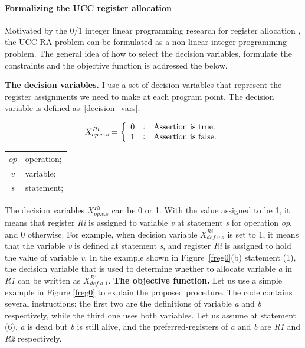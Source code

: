 \paragraph{Formalizing the UCC register allocation}
Motivated by the 0/1 integer linear programming research for register allocation \cite{related:ilp}, the UCC-RA problem 
can be formulated as a non-linear integer programming problem. The general idea of how to select the decision 
variables, formulate the constraints and the objective function is addressed the below. 

\textbf{The decision variables.} 
I use a set of decision variables that represent the register assignments we need to make at each program point. The 
decision variable is defined as~\ref{decision_vars}. 

\begin{small}
\begin{eqnarray}
X_{op.v.s}^{Ri} = \left\{\begin{array}{r@{\quad:\quad}l}
0  & \mbox{Assertion is true.}\\
1  & \mbox{Assertion is false.}
\label{decision_vars}
\end{array}\right.    
\end{eqnarray}

\begin{center}
\begin{tabular}{c|p{2.0in}} 
$op$ & operation;\\
$v$ &  variable;\\
$s$ & statement; \\
\end{tabular}
\end{center}
\end{small}

The decision variables $X_{op.v.s}^{Ri}$ can be 0 or 1.
With the value assigned to be 1, it means that register {\it Ri} is assigned to variable {\it v} at statement {\it s} 
for operation {\it op}, and 0 otherwise. For example, when decision variable $X_{def.v.s}^{Ri}$ is set to 1, it means 
that the variable {\it v} is defined at statement {\it s}, and  register {\it Ri} is assigned to hold the value of 
variable {\it v}. 
In the example shown in Figure~\ref{freg0}(b) statement (1), the decision variable that is used to determine whether
to allocate variable {\it a} in {\it R1} can be written as $X_{def.a.1}^{R1}$.
\textbf{The objective function.}
Let us use a simple example in Figure \ref{freg0} to explain the proposed procedure. The code contains several 
instructions: the first two are the definitions of variable {\it a} and {\it b} respectively, while the third one uses 
both variables. Let us assume at statement (6), {\it a} is dead but {\it b} is still alive, and the preferred-registers 
of {\it a} and {\it b} are {\it R1} and {\it R2} respectively.


